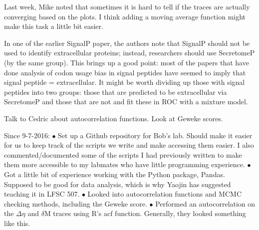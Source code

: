 \documentclass[11pt]{labbook}
\begin{document}
Last week, Mike noted that sometimes it is hard to tell if the traces are actually converging based on the plots. I think adding a moving average function might make this task a little bit easier. 

In one of the earlier SignalP paper, the authors note that SignalP should not be used to identify extracellular proteins; instead, researchers should use SecretomeP (by the same group). This brings up a good point: most of the papers that have done analysis of codon usage bias in signal peptides have seemed to imply that signal peptide = extracellular. It might be worth dividing up those with signal peptides into two groups: those that are predicted to be extracellular via SecretomeP and those that are not and fit these in ROC with a mixture model. 

Talk to Cedric about autocorrelation functions. Look at Geweke scores. 


Since 9-7-2016:
$\bullet$ Set up a Github repository for Bob's lab. Should make it easier for us to keep track of the scripts we write and make accessing them easier. I also commented/documented some of the scripts I had previously written to make them more accessible to my labmates who have little programming experience. \newline
$\bullet$ Got a little bit of experience working with the Python package, Pandas. Supposed to be good for data analysis, which is why Yaojin has suggested teaching it in LFSC 507. \newline
$\bullet$ Looked into autocorrelation functions and MCMC checking methods, including the Geweke score. \newline
$\bullet$ Performed an autocorrelation on the $\Delta\eta$ and $\delta$M traces using R's acf function. Generally, they looked something like this.

\end{document}
